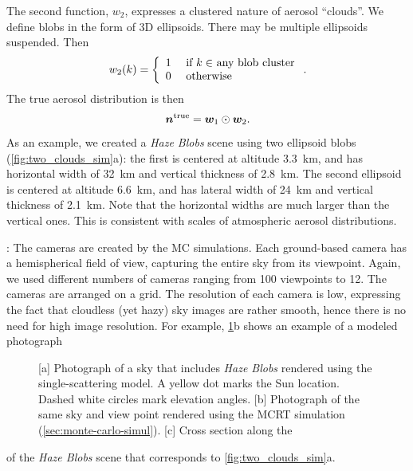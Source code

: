 \documentclass[10pt,letterpaper]{article}
\newcommand{\yoavcomment}[1]{}
\renewcommand{\yoavcomment}[1]{#1} %
\begin{document}
The second function, $w_2$, expresses a clustered nature of aerosol
``clouds''. We define blobs in the form of 3D ellipsoids. There may be
multiple ellipsoids suspended.  Then
\begin{equation}
  w_2(k) =
  \left\{
    \begin{array}{ll}
      1  & \mbox{ if $k\in$ any blob cluster} \\
      0  & \mbox{ otherwise}
      \label{eq:f2}
    \end{array}
  \right.
  .
  \hspace{-0.05cm}
\end{equation}
The true aerosol distribution is then
\begin{equation}
  \label{eq:ntrue}
  {\bm n}^{\rm true}={\bm w}_1\odot {\bm w}_2  .
  \hspace{-0.05cm}
\end{equation}
As an example, we created a {\em Haze Blobs} scene using two ellipsoid
blobs (\cref{fig:two_clouds_sim}a): the first is centered at altitude
\SI{3.3}{\km}, and has horizontal width of \SI{32}{\km} and vertical
thickness of \SI{2.8}{\km}. The second ellipsoid is centered at
altitude \SI{6.6}{\km}, and has lateral width of \SI{24}{\km} and
vertical thickness of \SI{2.1}{\km}. Note that the horizontal widths
are much larger than the vertical ones. This is consistent with scales
of atmospheric aerosol distributions.

: The cameras are created by the MC simulations.
Each ground-based camera has a hemispherical field of view, capturing
the entire sky from its viewpoint. Again, we used different numbers of
cameras ranging from 100 viewpoints to 12. The cameras are arranged on
a grid.  The resolution of each camera is low, expressing the fact
that cloudless (yet hazy) sky images are rather smooth, hence there is
no need for high image resolution.  For example,
\cref{fig:simulation-results1}b shows an example of a modeled
photograph
\begin{figure}
  \centering
  \yoavcomment{\def\svgwidth{0.95\columnwidth}}
  \caption{\small [a] Photograph of a sky that includes {\em Haze
      Blobs} rendered using the single-scattering model.  A yellow dot
    marks the Sun location. Dashed white circles mark elevation
    angles.  [b] Photograph of the same sky and view point rendered
    using the MCRT simulation (\cref{sec:monte-carlo-simul}).
    [c] Cross section along the 
  }
  \label{fig:simulation-results1}
\end{figure}
of the {\em Haze Blobs} scene that corresponds to
\cref{fig:two_clouds_sim}a.
\end{document}
